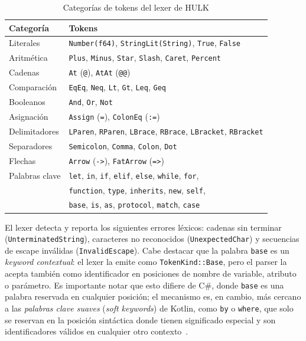 \documentclass[12pt, a4paper]{article}
\begin{document}
\begin{table}[h!]
\centering
\caption{Categorías de tokens del lexer de HULK}
\label{tab:tokens}
\begin{tabular}{@{}ll@{}}
\toprule
\textbf{Categoría} & \textbf{Tokens} \\
\midrule
Literales & \texttt{Number(f64)}, \texttt{StringLit(String)}, \texttt{True}, \texttt{False} \\
Aritmética & \texttt{Plus}, \texttt{Minus}, \texttt{Star}, \texttt{Slash}, \texttt{Caret}, \texttt{Percent} \\
Cadenas & \texttt{At} (\texttt{@}), \texttt{AtAt} (\texttt{@@}) \\
Comparación & \texttt{EqEq}, \texttt{Neq}, \texttt{Lt}, \texttt{Gt}, \texttt{Leq}, \texttt{Geq} \\
Booleanos & \texttt{And}, \texttt{Or}, \texttt{Not} \\
Asignación & \texttt{Assign} (\texttt{=}), \texttt{ColonEq} (\texttt{:=}) \\
Delimitadores & \texttt{LParen}, \texttt{RParen}, \texttt{LBrace}, \texttt{RBrace}, \texttt{LBracket}, \texttt{RBracket} \\
Separadores & \texttt{Semicolon}, \texttt{Comma}, \texttt{Colon}, \texttt{Dot} \\
Flechas & \texttt{Arrow} (\texttt{->}), \texttt{FatArrow} (\texttt{=>}) \\
Palabras clave & \texttt{let}, \texttt{in}, \texttt{if}, \texttt{elif}, \texttt{else}, \texttt{while}, \texttt{for}, \\
 & \texttt{function}, \texttt{type}, \texttt{inherits}, \texttt{new}, \texttt{self}, \\
 & \texttt{base}, \texttt{is}, \texttt{as}, \texttt{protocol}, \texttt{match}, \texttt{case} \\
\bottomrule
\end{tabular}
\end{table}

El lexer detecta y reporta los siguientes errores léxicos: cadenas sin terminar
(\texttt{UnterminatedString}), caracteres no reconocidos (\texttt{UnexpectedChar})
y secuencias de escape inválidas (\texttt{InvalidEscape}). Cabe destacar que la palabra
\texttt{base} es un \textit{keyword contextual}: el lexer la emite como
\texttt{TokenKind::Base}, pero el parser la acepta también como identificador
en posiciones de nombre de variable, atributo o parámetro. Es importante notar
que esto difiere de C\#, donde \texttt{base} es una palabra reservada en
cualquier posición; el mecanismo es, en cambio, más cercano a las
\textit{palabras clave suaves} (\textit{soft keywords}) de Kotlin, como
\texttt{by} o \texttt{where}, que solo se reservan en la posición sintáctica
donde tienen significado especial y son identificadores válidos en cualquier
otro contexto~\cite{jemerov2017}.
\end{document}
